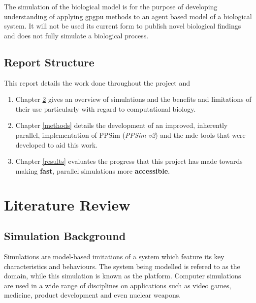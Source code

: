\documentclass{UoYCSproject}
\begin{document}
The simulation of the biological model is for the purpose of developing understanding of applying \gls{gpgpu} methods to an agent based model of a biological system. It will not be used its current form to publish novel biological findings and does not fully simulate a biological process.

\section{Report Structure}
This report details the work done throughout the project and 

\begin{enumerate}
    \item Chapter \ref{lit_review} gives an overview of simulations and the benefits and limitations of their use particularly with regard to computational biology.
    \item Chapter \ref{methods} details the development of an improved, inherently parallel, implementation of PPSim (\textit{PPSim v2}) and the \gls{mde} tools that were developed to aid this work.
    \item Chapter \ref{results} evaluates the progress that this project has made towards making \textbf{fast}, parallel simulations more \textbf{accessible}.
\end{enumerate}

\chapter{Literature Review}
\label{lit_review}
%

\section{Simulation Background}
\label{simulation}
Simulations are model-based imitations of a system which feature its key characteristics and behaviours.
The system being modelled is refered to as the domain, while this simulation is known as the platform.
Computer simulations are used in a wide range of disciplines on applications such as video games, medicine, product development and even nuclear weapons.
\end{document}
